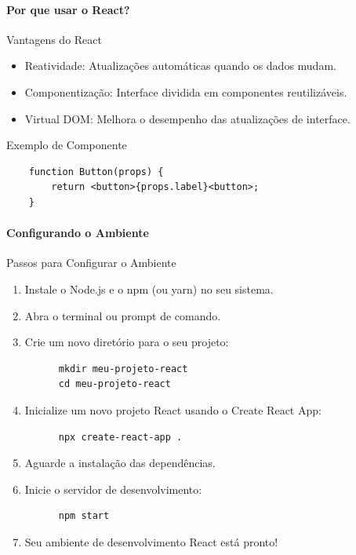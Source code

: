\documentclass[13pt, xcolor={dvipsnames,svgnames}, portuguese]{beamer}
\begin{document}
\begin{frame}[fragile]
 \framesubtitle{Por que usar o React?}
  \begin{block}{Vantagens do React}
    \begin{itemize}
      \item Reatividade: Atualizações automáticas quando os dados mudam.
      \item Componentização: Interface dividida em componentes reutilizáveis.
      \item Virtual DOM: Melhora o desempenho das atualizações de interface.
    \end{itemize}
  \end{block}
  
\begin{exampleblock}{Exemplo de Componente}
    \begin{verbatim}
	function Button(props) {
  		return <button>{props.label}<button>;
	}
    \end{verbatim}
\end{exampleblock}
\end{frame}


\begin{frame}[fragile]
\framesubtitle{Configurando o Ambiente}
  \begin{block}{Passos para Configurar o Ambiente}
    \begin{enumerate}
      \item Instale o Node.js e o npm (ou yarn) no seu sistema.
      \item Abra o terminal ou prompt de comando.
      \item Crie um novo diretório para o seu projeto:
      
      \begin{verbatim}
      mkdir meu-projeto-react
      cd meu-projeto-react
      \end{verbatim}
      
      \item Inicialize um novo projeto React usando o Create React App:
      
      \begin{verbatim}
      npx create-react-app .
      \end{verbatim}
      
      \item Aguarde a instalação das dependências.
      \item Inicie o servidor de desenvolvimento:
      
      \begin{verbatim}
      npm start
      \end{verbatim}
      
      \item Seu ambiente de desenvolvimento React está pronto!
    \end{enumerate}
  \end{block}
\end{frame}
\end{document}
